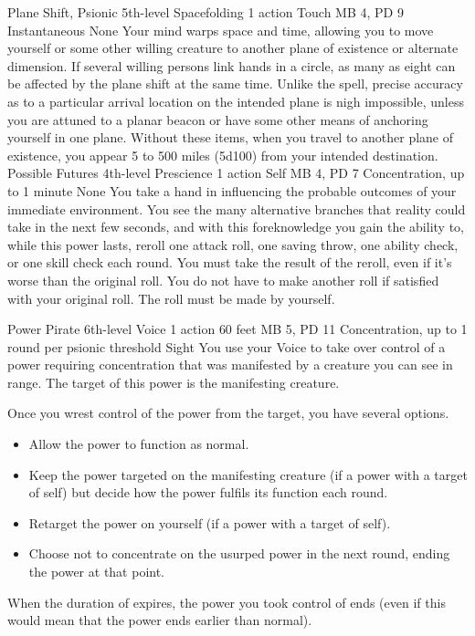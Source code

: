 \DndPowerHeader%
    {Plane Shift, Psionic\label{pwr:plane_shift_psionic}}
    {5th-level Spacefolding}
    {1 action}
    {Touch}
    {MB 4, PD 9}
    {Instantaneous}
    {None}
Your mind warps space and time, allowing
you to move yourself or some other willing creature to another plane
of existence or alternate dimension. If several willing persons
link hands in a circle, as many as eight can be affected by
the plane shift at the same time. Unlike the  spell, precise accuracy as to a particular arrival
location on the intended plane is nigh impossible, unless
you are attuned to a planar beacon or have some other means
of anchoring yourself in one plane. Without these items, when
you travel to another plane of existence, you appear 5 to
500 miles (5d100) from your intended destination.
\DndPowerHeader%
    {Possible Futures\label{pwr:possible_futures}}
    {4th-level Prescience}
    {1 action}
    {Self}
    {MB 4, PD 7}
    {Concentration, up to 1 minute}
    {None}
You take a hand in influencing the probable
outcomes of your immediate environment. You see the many alternative
branches that reality could take in the next few seconds,
and with this foreknowledge you gain the ability to, while
this power lasts, reroll one attack roll, one saving throw,
one ability check, or one skill check each round. You must
take the result of the reroll, even if it's worse than the
original roll. You do not have to make another roll if satisfied
with your original roll. The roll must be made by yourself.

\DndPowerHeader%
    {Power Pirate\label{pwr:power_pirate}}
    {6th-level Voice}
    {1 action}
    {60 feet}
    {MB 5, PD 11}
    {Concentration, up to 1 round per psionic threshold}
    {Sight}
You use your Voice to take over control of a power
requiring concentration that was manifested
by a creature you can see in range.
The target of this power is the manifesting creature.

Once you wrest control of the power from the target,
you have several options.
\begin{itemize}
  \item Allow the power to function as normal.
  \item Keep the power targeted on the manifesting creature
        (if a power with a target of self) but decide how
        the power fulfils its function each round.
  \item Retarget the power on yourself
        (if a power with a target of self).
  \item Choose not to concentrate on the usurped power
          in the next round, ending the power at that point.
\end{itemize}
When the duration of  expires,
the power you took control of ends
(even if this would mean that the power ends earlier than normal).

